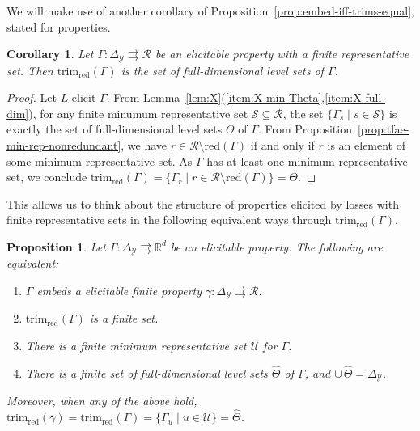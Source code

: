 \documentclass[11pt]{article}
\newcommand{\Comments}{1}
\newcommand{\mynote}[2]{\ifnum\Comments=1\textcolor{#1}{#2}\fi}
\newcommand{\mytodo}[2]{\ifnum\Comments=1%
  \todo[linecolor=#1!80!black,backgroundcolor=#1,bordercolor=#1!80!black]{#2}\fi}
\newcommand{\raft}[1]{\mytodo{green!20!white}{RF: #1}}
\newcommand{\jessie}[1]{\mynote{teal}{[JF: #1]}}
\newcommand{\jessiet}[1]{\mytodo{teal!20!white}{JF: #1}}
\newcommand{\reals}{\mathbb{R}}
\newcommand{\simplex}{\Delta_\Y}
\newcommand{\R}{\mathcal{R}}
\newcommand{\Sc}{\mathcal{S}}
\newcommand{\U}{\mathcal{U}}
\newcommand{\Y}{\mathcal{Y}}
\newcommand{\toto}{\rightrightarrows}
\newcommand{\red}{\mathrm{red}}
\newcommand{\trimred}{\mathrm{trim}_\red}
\newtheorem{proposition}{Proposition}
\newtheorem{corollary}{Corollary}
\begin{document}
We will make use of another corollary of Proposition~\ref{prop:embed-iff-trims-equal}, stated for properties.
\begin{corollary}\label{cor:trim-prop-red}
  Let $\Gamma : \simplex \toto \R$ be an elicitable property with a finite representative set.
  Then $\trimred(\Gamma)$ is the set of full-dimensional level sets of $\Gamma$.
\end{corollary}
\begin{proof}
  Let $L$ elicit $\Gamma$.
  From Lemma~\ref{lem:X}(\ref{item:X-min-Theta},\ref{item:X-full-dim}), for any finite minumum representative set $\Sc\subseteq\R$, the set $\{\Gamma_s\mid s\in\Sc\}$ is exactly the set of full-dimensional level sets $\Theta$ of $\Gamma$.
  From Proposition~\ref{prop:tfae-min-rep-nonredundant}, we have $r \in \R\setminus \red(\Gamma)$ if and only if $r$ is an element of some minimum representative set.
  As $\Gamma$ has at least one minimum representative set, we conclude $\trimred(\Gamma) = \{\Gamma_r \mid r\in \R\setminus\red(\Gamma)\} = \Theta$.  
\end{proof}

This allows us to think about the structure of properties elicited by losses with finite representative sets in the following equivalent ways through $\trimred(\Gamma)$.

\begin{proposition}\label{prop:embed-trim}
  Let $\Gamma:\simplex\toto\reals^d$ be an elicitable property.
  The following are equivalent:
  \begin{enumerate}\setlength{\itemsep}{0pt}
  \item $\Gamma$ embeds a elicitable finite property $\gamma:\simplex \toto \R$.
  \item $\trimred(\Gamma)$ is a finite set.%
  \item There is a finite minimum representative set $\U$ for $\Gamma$.
  \item There is a finite set of full-dimensional level sets $\hat\Theta$ of $\Gamma$, and $\cup\,\hat\Theta = \simplex$.
  \end{enumerate}
  Moreover, when any of the above hold, $\trimred(\gamma) = \trimred(\Gamma) = \{\Gamma_u \mid u\in\U\} = \hat\Theta$.
\end{proposition}
\end{document}

